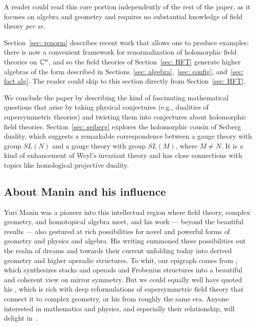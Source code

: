 \documentclass[11pt]{amsart}
\begin{document}
A reader could read this core portion independently of the rest of the paper,
as it focuses on algebra and geometry and requires no substantial knowledge of field theory {\it per se}.

Section~\ref{sec: renorm} describes recent work that allows one to produce examples:
there is now a convenient framework for renormalization of holomorphic field theories on $\mathbb C^n$,
and so the field theories of Section~\ref{sec: HFT} generate higher algebras of the form described in Sections~\ref{sec: algebra},~\ref{sec: config}, and~\ref{sec: fact alg}.
The reader could skip to this section directly from Section~\ref{sec: HFT}.

We conclude the paper by describing the kind of fascinating mathematical questions
that arise by taking physical conjectures (e.g., dualities of supersymmetric theories) and twisting them into conjectures about holomorphic field theories. 
Section~\ref{sec: seiberg} explores the holomorphic cousin of Seiberg duality,
which suggests a remarkable correspondence between a gauge theory with group $SL(N)$ and a gauge theory with group $SL(M)$, where $M \neq N$.
It is a kind of enhancement of Weyl's invariant theory and has close connections with topics like homological projective duality.

\subsection{About Manin and his influence}

Yuri Manin was a pioneer into this intellectual region where field theory, complex geometry, and homotopical algebra meet,
and his work --- beyond the beautiful results --- also gestured at rich possibilities for novel and powerful forms of geometry and physics and algebra.
His writing summoned these possibilities out the realm of dreams and towards their current unfolding today into derived geometry and higher operadic structures.
To whit, our epigraph comes from \cite{ManFrob}, which synthesizes stacks and operads and Frobenius structures into a beautiful and coherent view on mirror symmetry.
But we could equally well have quoted his \cite{ManGauge}, which is rich with deep reformulations of supersymmetric field theory that connect it to complex geometry,
or his \cite{BeiMan, ManNewDim} from roughly the same era.
Anyone interested in mathematics and physics, and especially their relationship, will delight in~\cite{ManMP}.
\end{document}
